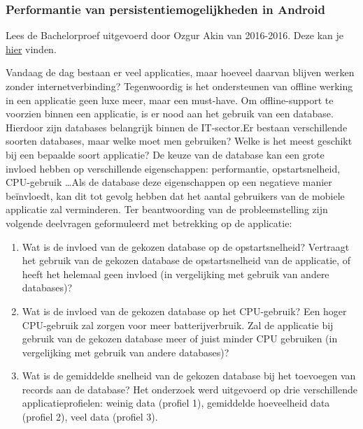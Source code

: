 \documentclass{beamer}
\begin{document}
\begin{frame}
	\frametitle{Performantie van persistentiemogelijkheden in Android}
	Lees de Bachelorproef uitgevoerd door Ozgur Akin van 2016-2016. Deze kan je \href{http://tinfbo2.hogent.be/nativeapps/index.php?r=bachelorpaper\%2Findex}{hier} vinden.
	
	\tiny 
	Vandaag de dag bestaan er veel applicaties, maar hoeveel daarvan blijven werken
	zonder internetverbinding? Tegenwoordig is het ondersteunen van offline werking in
	een applicatie geen luxe meer, maar een must-have. Om offline-support te voorzien
	binnen een applicatie, is er nood aan het gebruik van een database. Hierdoor zijn
	databases belangrijk binnen de IT-sector.Er bestaan verschillende soorten databases,
	maar welke moet men gebruiken?
	Welke is het meest geschikt bij een bepaalde soort applicatie? De keuze van de database
	kan een grote invloed hebben op verschillende eigenschappen: performantie,
	opstartsnelheid, CPU-gebruik \dots Als de database deze eigenschappen op een negatieve
	manier beïnvloedt, kan dit tot gevolg hebben dat het aantal gebruikers van de mobiele
	applicatie zal verminderen. Ter beantwoording van de probleemstelling zijn volgende
	deelvragen geformuleerd met betrekking op de applicatie:
	\begin{enumerate}
		\item Wat is de invloed van de gekozen database op de opstartsnelheid? Vertraagt het
		gebruik van de gekozen database de opstartsnelheid van de applicatie, of heeft
		het helemaal geen invloed (in vergelijking met gebruik van andere databases)?
		\item  Wat is de invloed van de gekozen database op het CPU-gebruik? Een hoger
		CPU-gebruik zal zorgen voor meer batterijverbruik. Zal de applicatie bij gebruik
		van de gekozen database meer of juist minder CPU gebruiken (in vergelijking
		met gebruik van andere databases)?
		\item Wat is de gemiddelde snelheid van de gekozen database bij het toevoegen van
		records aan de database?
		Het onderzoek werd uitgevoerd op drie verschillende applicatieprofielen: weinig data
		(profiel 1), gemiddelde hoeveelheid data (profiel 2), veel data (profiel 3). 
	\end{enumerate}
\end{frame}
\end{document}
